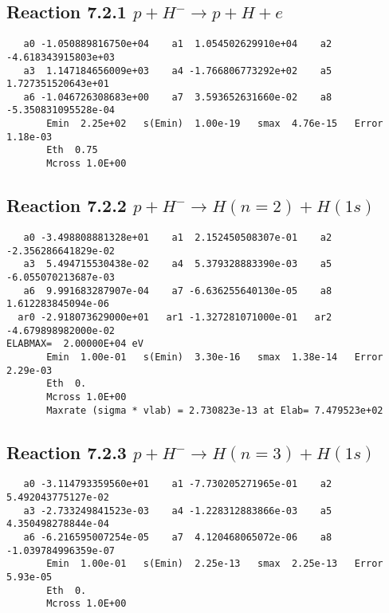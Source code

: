 \documentclass[12pt,dvipdfmx]{article}
\begin{document}
\newpage
\subsection{
Reaction 7.2.1 $   p + H^- \rightarrow p + H + e$}


\begin{small}\begin{verbatim}
   a0 -1.050889816750e+04    a1  1.054502629910e+04    a2 -4.618343915803e+03
   a3  1.147184656009e+03    a4 -1.766806773292e+02    a5  1.727351520643e+01
   a6 -1.046726308683e+00    a7  3.593652631660e-02    a8 -5.350831095528e-04
       Emin  2.25e+02   s(Emin)  1.00e-19   smax  4.76e-15   Error  1.18e-03
       Eth  0.75
       Mcross 1.0E+00
\end{verbatim}\end{small}

\newpage
\subsection{
Reaction 7.2.2 $   p + H^- \rightarrow H(n=2) + H(1s)$}


\begin{small}\begin{verbatim}
   a0 -3.498808881328e+01    a1  2.152450508307e-01    a2 -2.356286641829e-02
   a3  5.494715530438e-02    a4  5.379328883390e-03    a5 -6.055070213687e-03
   a6  9.991683287907e-04    a7 -6.636255640130e-05    a8  1.612283845094e-06
  ar0 -2.918073629000e+01   ar1 -1.327281071000e-01   ar2 -4.679898982000e-02
ELABMAX=  2.00000E+04 eV
       Emin  1.00e-01   s(Emin)  3.30e-16   smax  1.38e-14   Error  2.29e-03
       Eth  0.
       Mcross 1.0E+00
       Maxrate (sigma * vlab) = 2.730823e-13 at Elab= 7.479523e+02
\end{verbatim}\end{small}








\newpage
\subsection{
Reaction 7.2.3 $   p + H^- \rightarrow H(n=3) + H(1s)$}


\begin{small}\begin{verbatim}
   a0 -3.114793359560e+01    a1 -7.730205271965e-01    a2  5.492043775127e-02
   a3 -2.733249841523e-03    a4 -1.228312883866e-03    a5  4.350498278844e-04
   a6 -6.216595007254e-05    a7  4.120468065072e-06    a8 -1.039784996359e-07
       Emin  1.00e-01   s(Emin)  2.25e-13   smax  2.25e-13   Error  5.93e-05
       Eth  0.
       Mcross 1.0E+00
\end{verbatim}\end{small}
\end{document}
